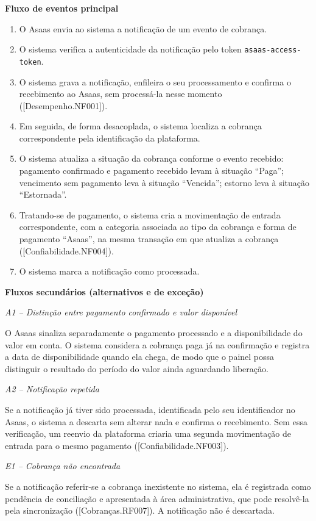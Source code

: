 \documentclass[11pt,a4paper,oneside]{report}
\newcommand{\fluxoprincipal}{\par\textbf{Fluxo de eventos principal}\par}
\newcommand{\fluxossecundarios}{\par\textbf{Fluxos secundários (alternativos e de exceção)}\par}
\newcommand{\fluxo}[2]{\par\smallskip\textit{#1 -- #2}\par}
\begin{document}
\fluxoprincipal
\begin{enumerate}
  \item O Asaas envia ao sistema a notificação de um evento de cobrança.
  \item O sistema verifica a autenticidade da notificação pelo token \texttt{asaas-access-token}.
  \item O sistema grava a notificação, enfileira o seu processamento e confirma o recebimento ao
        Asaas, sem processá-la nesse momento ([Desempenho.NF001]).
  \item Em seguida, de forma desacoplada, o sistema localiza a cobrança correspondente pela
        identificação da plataforma.
  \item O sistema atualiza a situação da cobrança conforme o evento recebido: pagamento confirmado
        e pagamento recebido levam à situação ``Paga''; vencimento sem pagamento leva à situação
        ``Vencida''; estorno leva à situação ``Estornada''.
  \item Tratando-se de pagamento, o sistema cria a movimentação de entrada correspondente, com a
        categoria associada ao tipo da cobrança e forma de pagamento ``Asaas'', na mesma transação
        em que atualiza a cobrança ([Confiabilidade.NF004]).
  \item O sistema marca a notificação como processada.
\end{enumerate}

\fluxossecundarios

\fluxo{A1}{Distinção entre pagamento confirmado e valor disponível}
O Asaas sinaliza separadamente o pagamento processado e a disponibilidade do valor em conta. O
sistema considera a cobrança paga já na confirmação e registra a data de disponibilidade quando ela
chega, de modo que o painel possa distinguir o resultado do período do valor ainda aguardando
liberação.

\fluxo{A2}{Notificação repetida}
Se a notificação já tiver sido processada, identificada pelo seu identificador no Asaas, o sistema
a descarta sem alterar nada e confirma o recebimento. Sem essa verificação, um reenvio da
plataforma criaria uma segunda movimentação de entrada para o mesmo pagamento
([Confiabilidade.NF003]).

\fluxo{E1}{Cobrança não encontrada}
Se a notificação referir-se a cobrança inexistente no sistema, ela é registrada como pendência de
conciliação e apresentada à área administrativa, que pode resolvê-la pela sincronização
([Cobranças.RF007]). A notificação não é descartada.
\end{document}
